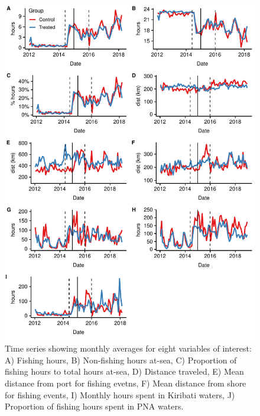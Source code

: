 \documentclass[9p,twocolumn,twoside,lineno]{pnas-new}
\begin{document}
\clearpage

\begin{figure}
\centering
\includegraphics{img/all_panels.pdf}
\caption{\label{fig:all_panels}Time series showing monthly averages for eight variables of interest: A) Fishing hours, B) Non-fishing hours at-sea, C) Proportion of fishing hours to total hours at-sea, D) Distance traveled, E) Mean distance from port for fishing evetns, F) Mean distance from shore for fishing events, I) Monthly hours spent in Kiribati waters, J) Proportion of fishing hours spent in PNA waters.}
\end{figure}

\clearpage
\end{document}
